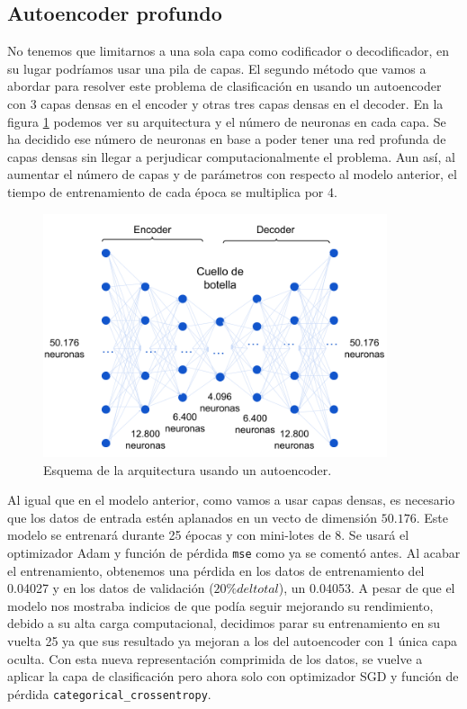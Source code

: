 \subsection{Autoencoder profundo}

No tenemos que limitarnos a una sola capa como codificador o decodificador, en su lugar podríamos usar una pila de capas. El segundo método que vamos a abordar para resolver este problema de clasificación en usando un autoencoder con 3 capas densas en el encoder y otras tres capas densas en el decoder. En la figura \ref{img: daeMMC} podemos ver su arquitectura y el número de neuronas en cada capa. Se ha decidido ese número de neuronas en base a poder tener una red profunda de capas densas sin llegar a perjudicar computacionalmente el problema. Aun así, al aumentar el número de capas y de parámetros con respecto al modelo anterior, el tiempo de entrenamiento de cada época se multiplica por 4. 

\begin{figure}[h]
    \begin{center}
    \includegraphics[width=0.9\textwidth]{img/daeMMC.png}
    \end{center}
    \caption{Esquema de la arquitectura usando un autoencoder.}
    \label{img: daeMMC}
\end{figure}

Al igual que en el modelo anterior, como vamos a usar capas densas, es necesario que los datos de entrada estén aplanados en un vecto de dimensión $50.176$. Este modelo se entrenará durante 25 épocas y con mini-lotes de 8. Se usará el optimizador Adam y función de pérdida \lstinline|mse| como ya se comentó antes. Al acabar el entrenamiento, obtenemos una pérdida en los datos de entrenamiento del 0.04027 y en los datos de validación ($20\% del total$), un 0.04053. A pesar de que el modelo nos mostraba indicios de que podía seguir mejorando su rendimiento, debido a su alta carga computacional, decidimos parar su entrenamiento en su vuelta 25 ya que sus resultado ya mejoran a los del autoencoder con 1 única capa oculta. Con esta nueva representación comprimida de los datos, se vuelve a aplicar la capa de clasificación pero ahora solo con optimizador SGD y función de pérdida \lstinline|categorical_crossentropy|.



